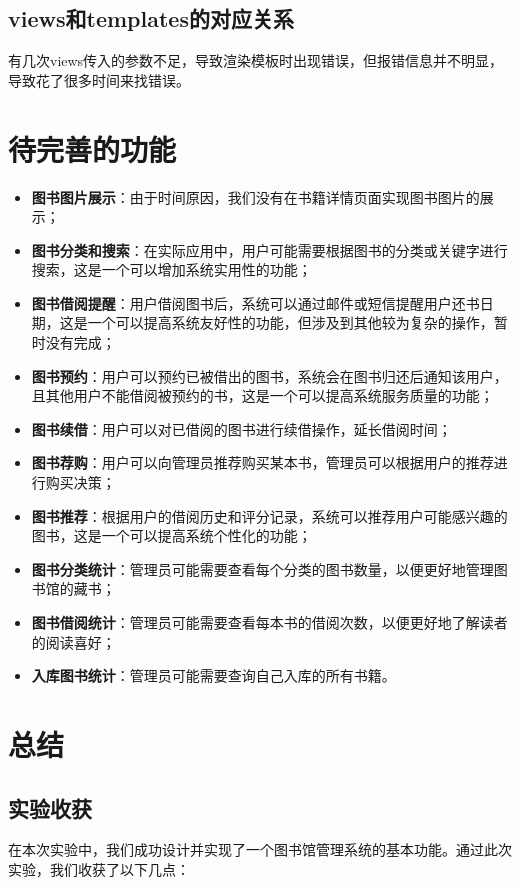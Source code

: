 \documentclass{ctexart}
\begin{document}
    \subsection{views和templates的对应关系}
    有几次views传入的参数不足，导致渲染模板时出现错误，但报错信息并不明显，导致花了很多时间来找错误。
    \section{待完善的功能}
    \begin{itemize}
        \item \textbf{图书图片展示}：由于时间原因，我们没有在书籍详情页面实现图书图片的展示；
        \item \textbf{图书分类和搜索}：在实际应用中，用户可能需要根据图书的分类或关键字进行搜索，这是一个可以增加系统实用性的功能；
        \item \textbf{图书借阅提醒}：用户借阅图书后，系统可以通过邮件或短信提醒用户还书日期，这是一个可以提高系统友好性的功能，但涉及到其他较为复杂的操作，暂时没有完成；
        \item \textbf{图书预约}：用户可以预约已被借出的图书，系统会在图书归还后通知该用户，且其他用户不能借阅被预约的书，这是一个可以提高系统服务质量的功能；
        \item \textbf{图书续借}：用户可以对已借阅的图书进行续借操作，延长借阅时间；
        \item \textbf{图书荐购}：用户可以向管理员推荐购买某本书，管理员可以根据用户的推荐进行购买决策；
        \item \textbf{图书推荐}：根据用户的借阅历史和评分记录，系统可以推荐用户可能感兴趣的图书，这是一个可以提高系统个性化的功能；
        \item \textbf{图书分类统计}：管理员可能需要查看每个分类的图书数量，以便更好地管理图书馆的藏书；
        \item \textbf{图书借阅统计}：管理员可能需要查看每本书的借阅次数，以便更好地了解读者的阅读喜好；
        \item \textbf{入库图书统计}：管理员可能需要查询自己入库的所有书籍。
    \end{itemize} 
    \section{总结}
	\subsection{实验收获}

	在本次实验中，我们成功设计并实现了一个图书馆管理系统的基本功能。通过此次实验，我们收获了以下几点：
	
\end{document}
